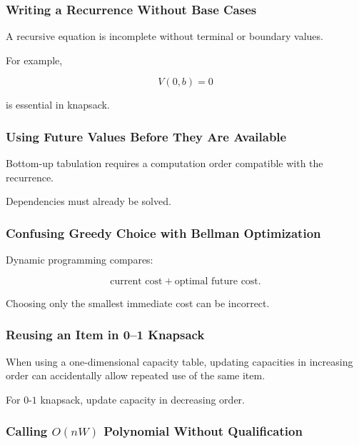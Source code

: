 \subsubsection{Writing a Recurrence Without Base Cases}

A recursive equation is incomplete without terminal or boundary values.

For example,

\[
V(0,b)=0
\]

is essential in knapsack.

\subsubsection{Using Future Values Before They Are Available}

Bottom-up tabulation requires a computation order compatible with the
recurrence.

Dependencies must already be solved.

\subsubsection{Confusing Greedy Choice with Bellman Optimization}

Dynamic programming compares:

\[
\boxed{
\text{current cost}
+
\text{optimal future cost}.
}
\]

Choosing only the smallest immediate cost can be incorrect.

\subsubsection{Reusing an Item in 0--1 Knapsack}

When using a one-dimensional capacity table, updating capacities in
increasing order can accidentally allow repeated use of the same item.

For \(0\)-\(1\) knapsack, update capacity in decreasing order.

\subsubsection{Calling \(O(nW)\) Polynomial Without Qualification}

